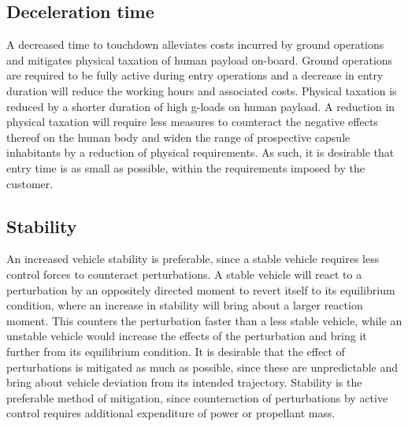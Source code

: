 \subsection{Deceleration time}
A decreased time to touchdown alleviates costs incurred by ground operations and mitigates physical taxation of human payload on-board. Ground operations are required to be fully active during entry operations and a decrease in entry duration will reduce the working hours and associated costs. Physical taxation is reduced by a shorter duration of high g-loads on human payload. A reduction in physical taxation will require less measures to counteract the negative effects thereof on the human body and widen the range of prospective capsule inhabitants by a reduction of physical requirements. As such, it is desirable that entry time is as small as possible, within the requirements imposed by the customer.


\subsection{Stability}
An increased vehicle stability is preferable, since a stable vehicle requires less control forces to counteract perturbations. A stable vehicle will react to a perturbation by an oppositely directed moment to revert itself to its equilibrium condition, where an increase in stability will bring about a larger reaction moment. This counters the perturbation faster than a less stable vehicle, while an unstable vehicle would increase the effects of the perturbation and bring it further from its equilibrium condition. It is desirable that the effect of perturbations is mitigated as much as possible, since these are unpredictable and bring about vehicle deviation from its intended trajectory. Stability is the preferable method of mitigation, since counteraction of perturbations by active control requires additional expenditure of power or propellant mass. 

